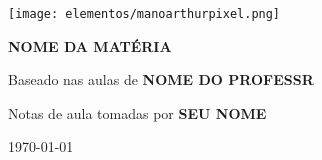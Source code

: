 \begin{titlepage}
    \centering
    
    \vspace*{1cm}
    \texttt{[image: elementos/manoarthurpixel.png]} %
    
    \vspace{4cm}
    
    {\Large\bfseries NOME DA MATÉRIA  \par}
    
    \vspace{1cm}
    
    {\large Baseado nas aulas de \textbf{NOME DO PROFESSR} \par}
    {\large Notas de aula tomadas por \textbf{SEU NOME} \par}
    
    \vfill
    {\normalsize \today \par} %
\end{titlepage}


